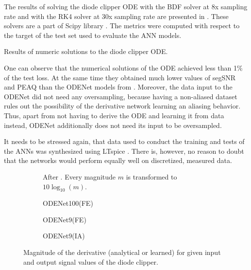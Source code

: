 The results of solving the diode clipper \ac{ODE} with the \ac{BDF} solver at 8x sampling rate and with the \ac{RK}4 solver at 30x sampling rate are presented in . These solvers are a part of Scipy library \cite{SciPy}. The metrics were computed with respect to the target of the test set used to evaluate the \ac{ANN} models.

\begin{table}[]
    \centering
    \caption{Results of numeric solutions to the diode clipper \ac{ODE}.}
    
    \label{tab:diode_clipper_ode_solvers}
\end{table}

One can observe that the numerical solutions of the \ac{ODE} achieved less than 1\% of the test loss. At the same time they obtained much lower values of \ac{segSNR} and \ac{PEAQ} than the ODENet models from . Moreover, the data input to the ODENet did not need any oversampling, because having a non-aliased dataset rules out the possibility of the derivative network learning an aliasing behavior. Thus, apart from not having to derive the \ac{ODE} and learning it from data instead, ODENet additionally does not need its input to be oversampled.

It needs to be stressed again, that data used to conduct the training and tests of the \acp{ANN} was synthesized using LTspice \cite{LTspice}. There is, however, no reason to doubt that the networks would perform equally well on discretized, measured data.

\newcommand{\subfigureWidth}{0.4\textwidth}
\newcommand{\subfigureScale}{0.8}

\begin{figure}
    \centering
    \begin{subfigure}{0.9\textwidth}
        \centering
        \scalebox{\subfigureScale}{}
        \caption{After . Every magnitude $m$ is transformed to $10 \log_{10}(m)$.}
    \end{subfigure}
    \begin{subfigure}{0.9\textwidth}
        \centering
        \scalebox{\subfigureScale}{}
        \caption{ODENet100(FE)}
    \end{subfigure}
    \begin{subfigure}{\subfigureWidth}
        \scalebox{0.75}{}
        \caption{ODENet9(FE)}
    \end{subfigure}
    \begin{subfigure}{\subfigureWidth}
        \scalebox{0.76}{}
        \caption{ODENet9(IA)}
    \end{subfigure}
    \caption{Magnitude of the derivative (analytical or learned) for given input and output signal values of the diode clipper.}
    \label{fig:diode_clipper_derivative_visualizations}
\end{figure}

